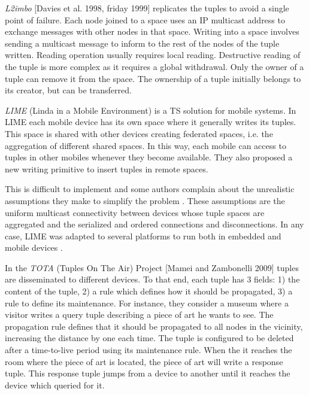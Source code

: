 \emph{L2imbo} [Davies et al. 1998, friday 1999] replicates the tuples to avoid a single point of failure. %
Each node joined to a space uses an IP multicast address to exchange messages with other nodes in that space.
Writing into a space involves sending a multicast message to inform to the rest of the nodes of the tuple written.
Reading operation usually requires local reading.
Destructive reading of the tuple is more complex as it requires a global withdrawal.
Only the owner of a tuple can remove it from the space.
The ownership of a tuple initially belongs to its creator, but can be transferred. %


\emph{LIME} (Linda in a Mobile Environment) \cite{picco_lime:_1999} is a TS solution for mobile systems.
In LIME each mobile device has its own space where it generally writes its tuples.
This space is shared with other devices creating federated spaces, i.e. the aggregation of different shared spaces.
In this way, each mobile can access to tuples in other mobiles whenever they become available.
They also proposed a new writing primitive to insert tuples in remote spaces.

This is difficult to implement and some authors complain about the unrealistic assumptions they make to simplify the problem \cite{coulouris_distributed_2012}. %
These assumptions are the uniform multicast connectivity between devices whose tuple spaces are aggregated and the serialized and ordered connections and disconnections.
In any case, LIME was adapted to several platforms to run both in embedded and mobile devices \cite{murphy_transiently_2006}.


In the \emph{TOTA} (Tuples On The Air) Project [Mamei and Zambonelli 2009] tuples are disseminated to different devices. %
To that end, each tuple has 3 fields:
1) the content of the tuple,
2) a rule which defines how it should be propagated,
3) a rule to define its maintenance.
For instance, they consider a museum where a visitor writes a query tuple describing a piece of art he wants to see.
The propagation rule defines that it should be propagated to all nodes in the vicinity, increasing the distance by one each time.
The tuple is configured to be deleted after a time-to-live period using its maintenance rule.
When the it reaches the room where the piece of art is located, the piece of art will write a response tuple.
This response tuple jumps from a device to another until it reaches the device which queried for it.


